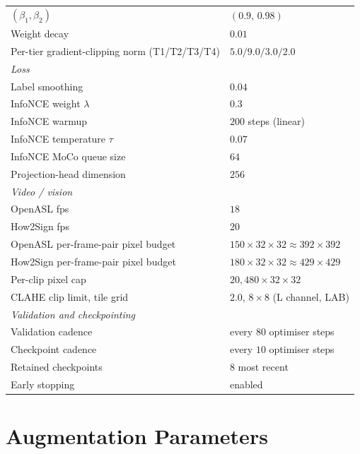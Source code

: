 \documentclass{article}
\begin{document}
\begin{table}[H]
\begin{tabular}{l l}
$(\beta_1, \beta_2)$                        & $(0.9,\, 0.98)$ \\
Weight decay                                & $0.01$ \\
Per-tier gradient-clipping norm (T1/T2/T3/T4) & $5.0 / 9.0 / 3.0 / 2.0$ \\
\midrule
\multicolumn{2}{l}{\emph{Loss}} \\
Label smoothing                             & $0.04$ \\
InfoNCE weight $\lambda$                    & $0.3$ \\
InfoNCE warmup                              & $200$ steps (linear) \\
InfoNCE temperature $\tau$                  & $0.07$ \\
InfoNCE MoCo queue size                     & $64$ \\
Projection-head dimension                   & $256$ \\
\midrule
\multicolumn{2}{l}{\emph{Video / vision}} \\
OpenASL fps                                 & $18$ \\
How2Sign fps                                & $20$ \\
OpenASL per-frame-pair pixel budget         & $150 \times 32 \times 32 \approx 392{\times}392$ \\
How2Sign per-frame-pair pixel budget        & $180 \times 32 \times 32 \approx 429{\times}429$ \\
Per-clip pixel cap                          & $20{,}480 \times 32 \times 32$ \\
CLAHE clip limit, tile grid                 & $2.0$, $8 \times 8$ (L channel, LAB) \\
\midrule
\multicolumn{2}{l}{\emph{Validation and checkpointing}} \\
Validation cadence                          & every $80$ optimiser steps \\
Checkpoint cadence                          & every $10$ optimiser steps \\
Retained checkpoints                        & $8$ most recent \\
Early stopping                              & enabled \\
\bottomrule
\end{tabular}
\end{table}


\section{Augmentation Parameters}
\label{app:augmentation}
\end{document}
